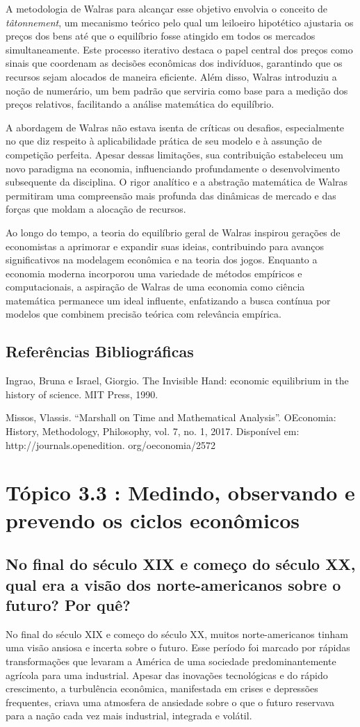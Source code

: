 \documentclass[a4paper,12pt]{article}[abntex2]
\begin{document}
A metodologia de Walras para alcançar esse objetivo envolvia o conceito de \textit{tâtonnement}, um mecanismo teórico pelo qual um leiloeiro hipotético ajustaria os preços dos bens até que o equilíbrio fosse atingido em todos os mercados simultaneamente. Este processo iterativo destaca o papel central dos preços como sinais que coordenam as decisões econômicas dos indivíduos, garantindo que os recursos sejam alocados de maneira eficiente. Além disso, Walras introduziu a noção de numerário, um bem padrão que serviria como base para a medição dos preços relativos, facilitando a análise matemática do equilíbrio.

A abordagem de Walras não estava isenta de críticas ou desafios, especialmente no que diz respeito à aplicabilidade prática de seu modelo e à assunção de competição perfeita. Apesar dessas limitações, sua contribuição estabeleceu um novo paradigma na economia, influenciando profundamente o desenvolvimento subsequente da disciplina. O rigor analítico e a abstração matemática de Walras permitiram uma compreensão mais profunda das dinâmicas de mercado e das forças que moldam a alocação de recursos.

Ao longo do tempo, a teoria do equilíbrio geral de Walras inspirou gerações de economistas a aprimorar e expandir suas ideias, contribuindo para avanços significativos na modelagem econômica e na teoria dos jogos. Enquanto a economia moderna incorporou uma variedade de métodos empíricos e computacionais, a aspiração de Walras de uma economia como ciência matemática permanece um ideal influente, enfatizando a busca contínua por modelos que combinem precisão teórica com relevância empírica.

\subsection{\textbf{Referências Bibliográficas}}
Ingrao, Bruna e Israel, Giorgio. The Invisible Hand: economic equilibrium in the history of
science. MIT Press, 1990.

Missos, Vlassis. “Marshall on Time and Mathematical Analysis”. OEconomia: History,
Methodology, Philosophy, vol. 7, no. 1, 2017. Disponível em: http://journals.openedition.
org/oeconomia/2572

\newpage
\section{\textbf{Tópico 3.3 : Medindo, observando e prevendo os ciclos econômicos}}
\subsection{\textbf{No final do século XIX e começo do século XX, qual era a visão dos norte-americanos sobre o futuro? Por quê?}}
No final do século XIX e começo do século XX, muitos norte-americanos tinham uma visão ansiosa e incerta sobre o futuro. Esse período foi marcado por rápidas transformações que levaram a América de uma sociedade predominantemente agrícola para uma industrial. Apesar das inovações tecnológicas e do rápido crescimento, a turbulência econômica, manifestada em crises e depressões frequentes, criava uma atmosfera de ansiedade sobre o que o futuro reservava para a nação cada vez mais industrial, integrada e volátil.
\end{document}
